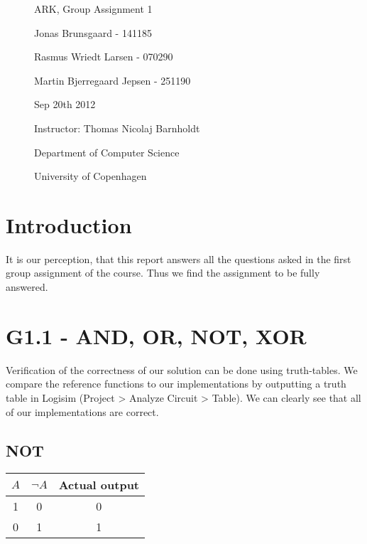 \documentclass[11pt,a4paper]{article}
\begin{document}
\begin{figure}
  \thispagestyle{empty}
  \centering
    \vspace*{0.5cm}
    {\Huge ARK, Group Assignment 1 \par
    }\par
    \par
    \vspace*{0.4cm}
    \large Jonas Brunsgaard - 141185 \par
        Rasmus Wriedt Larsen - 070290 \par
        Martin Bjerregaard Jepsen - 251190 \par
    \vspace*{0.4cm}
    Sep 20th 2012 \par
    \vspace*{0.4cm}
    \small Instructor: Thomas Nicolaj Barnholdt \par
    \vspace*{0.4cm}
    \small Department of Computer Science \par
    \small University of Copenhagen \par
\end{figure}
\clearpage
\thispagestyle{plain}

\section*{Introduction}
It is our perception, that this report answers all the questions asked in the
first group assignment of the course. Thus we find the assignment to be fully
answered.

\section*{G1.1 - AND, OR, NOT, XOR}

Verification of the correctness of our solution can be done using truth-tables.
We compare the reference functions to our implementations by outputting a truth
table in Logisim (Project > Analyze Circuit > Table). We can clearly see that
all of our implementations are correct.

\subsection*{NOT} %
\label{sub:NOT}

\begin{table}[htb!]
    \centering
    \begin{tabular}{c || c || c}
    $A$ & $\lnot A$ & Actual output \\ \hline
    1 & 0                & 0             \\
    0 & 1                & 1             \\
    \end{tabular}
\end{table}
\end{document}
